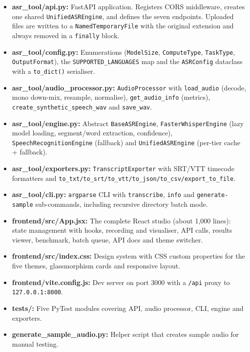 \documentclass[11pt,a4paper]{article}
\begin{document}
\begin{itemize}[leftmargin=1.2em]
  \item \textbf{asr\_tool/api.py:} FastAPI application. Registers CORS middleware, creates one shared \texttt{UnifiedASREngine}, and defines the seven endpoints. Uploaded files are written to a \texttt{NamedTemporaryFile} with the original extension and always removed in a \texttt{finally} block.
  \item \textbf{asr\_tool/config.py:} Enumerations (\texttt{ModelSize}, \texttt{ComputeType}, \texttt{TaskType}, \texttt{OutputFormat}), the \texttt{SUPPORTED\_LANGUAGES} map and the \texttt{ASRConfig} dataclass with a \texttt{to\_dict()} serialiser.
  \item \textbf{asr\_tool/audio\_processor.py:} \texttt{AudioProcessor} with \texttt{load\_audio} (decode, mono down-mix, resample, normalise), \texttt{get\_audio\_info} (metrics), \texttt{create\_synthetic\_speech\_wav} and \texttt{save\_wav}.
  \item \textbf{asr\_tool/engine.py:} Abstract \texttt{BaseASREngine}, \texttt{FasterWhisperEngine} (lazy model loading, segment/word extraction, confidence), \texttt{SpeechRecognitionEngine} (fallback) and \texttt{UnifiedASREngine} (per-tier cache + fallback).
  \item \textbf{asr\_tool/exporters.py:} \texttt{TranscriptExporter} with SRT/VTT timecode formatters and \texttt{to\_txt/to\_srt/to\_vtt/to\_json/to\_csv/export\_to\_file}.
  \item \textbf{asr\_tool/cli.py:} \texttt{argparse} CLI with \texttt{transcribe}, \texttt{info} and \texttt{generate-sample} sub-commands, including recursive directory batch mode.
  \item \textbf{frontend/src/App.jsx:} The complete React studio (about 1,000 lines): state management with hooks, recording and visualiser, API calls, results viewer, benchmark, batch queue, API docs and theme switcher.
  \item \textbf{frontend/src/index.css:} Design system with CSS custom properties for the five themes, glassmorphism cards and responsive layout.
  \item \textbf{frontend/vite.config.js:} Dev server on port 3000 with a \texttt{/api} proxy to \texttt{127.0.0.1:8000}.
  \item \textbf{tests/:} Five PyTest modules covering API, audio processor, CLI, engine and exporters.
  \item \textbf{generate\_sample\_audio.py:} Helper script that creates sample audio for manual testing.
\end{itemize}
\end{document}
